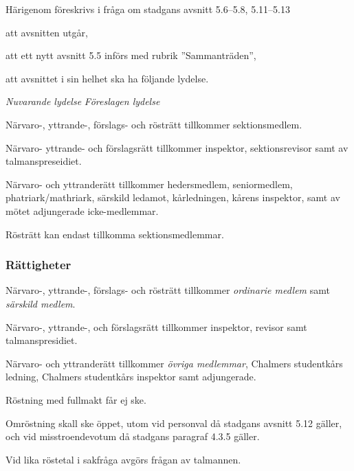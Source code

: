 \documentclass{article}
\newenvironment{lydelse}
    {\begin{paracol}{2}%
        \emph{Nuvarande lydelse}%
        \switchcolumn%
        \emph{Föreslagen lydelse}%
    \end{paracol}%
    \begin{enumerate}[label=\thesubsection.\arabic*]%
    \begin{paracol}{2}%
    }{\end{paracol}\end{enumerate}}
\begin{document}
Härigenom föreskrivs i fråga om stadgans avsnitt 5.6--5.8, 5.11--5.13
\begin{dels}
  \item att avsnitten utgår,
  \item att ett nytt avsnitt 5.5 införs med rubrik ''Sammanträden'',
  \item att avsnittet i sin helhet ska ha följande lydelse.
\end{dels}
\begin{lydelse}
  \setcounter{subsection}{6}
  \item Närvaro-, yttrande-, förslags- och rösträtt tillkommer sektionsmedlem.
  
  \item Närvaro- yttrande- och förslagsrätt tillkommer inspektor, sektionsrevisor samt av talmanspreseidiet.
  
  \item Närvaro- och yttranderätt tillkommer
  heders\-med\-lem, seniormedlem, phatriark/mathriark, särskild ledamot, kårledningen, kårens inspektor, samt av mötet adjungerade icke-medlemmar.

  \item Rösträtt kan endast tillkomma sektionsmedlemmar.
  
  \switchcolumn
  \setcounter{subsection}{5}
  \subsubsection*{Rättigheter}
  \item Närvaro-, yttrande-, förslags- och rösträtt tillkommer \emph{ordinarie medlem} samt \emph{särskild medlem}. \label{5.x:rösträtt}
  \item Närvaro-, yttrande-, och förslagsrätt tillkommer inspektor, revisor samt talmanspresidiet.
  \item Närvaro- och yttranderätt tillkommer \emph{övriga medlemmar}, Chalmers studentkårs ledning, Chalmers studentkårs inspektor samt adjungerade. \label{5.x:grundrätt}

  \switchcolumn*
  \setcounter{subsection}{11}
  \setcounter{enumi}{0}
  \item Röstning med fullmakt får ej ske.

  \item Omröstning skall ske öppet, utom vid personval då stadgans avsnitt 5.12 gäller, och vid misstroendevotum då stadgans paragraf 4.3.5 gäller.

  \item Vid lika röstetal i sakfråga avgörs frågan av talmannen.
  

\end{lydelse}
\end{document}
